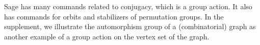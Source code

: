 Sage has many commands related to conjugacy, which is a group action.  It also has commands for orbits and stabilizers of permutation groups.  In the supplement, we illustrate the automorphism group of a (combinatorial) graph as another example of a group action on the vertex set of the graph.